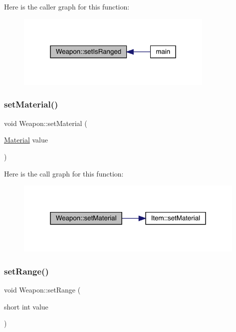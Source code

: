 Here is the caller graph for this function\+:
\nopagebreak
\begin{figure}[H]
\begin{center}
\leavevmode
\includegraphics[width=268pt]{class_weapon_a73bb6176d7e535811f30a3ee9df53b8d_icgraph}
\end{center}
\end{figure}
\mbox{\label{class_weapon_a2861d732a0cccff20a9ea29548d05702}} 
\subsubsection{\texorpdfstring{set\+Material()}{setMaterial()}}
{\footnotesize\ttfamily void Weapon\+::set\+Material (\begin{DoxyParamCaption}\item[{\mbox{\hyperlink{class_material}{Material}}}]{value }\end{DoxyParamCaption})}

Here is the call graph for this function\+:
\nopagebreak
\begin{figure}[H]
\begin{center}
\leavevmode
\includegraphics[width=313pt]{class_weapon_a2861d732a0cccff20a9ea29548d05702_cgraph}
\end{center}
\end{figure}
\mbox{\label{class_weapon_aa6f690fe5e69ce11628b245739c74dc5}} 
\subsubsection{\texorpdfstring{set\+Range()}{setRange()}}
{\footnotesize\ttfamily void Weapon\+::set\+Range (\begin{DoxyParamCaption}\item[{short int}]{value }\end{DoxyParamCaption})}

